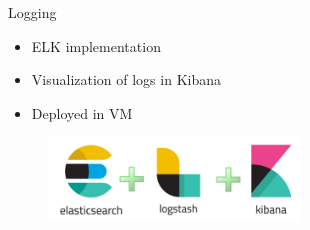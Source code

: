 \begin{frame}{Logging}
	\begin{itemize}
	\item ELK implementation
        \item Visualization of logs in  Kibana
        \item Deployed in VM
	\end{itemize}
	\begin{figure}[htbp]
  		\centering
  		\includegraphics[width=0.6\textwidth]{figures/elk}
	\end{figure}
\end{frame}